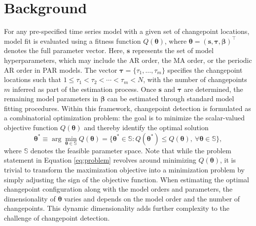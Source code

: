 \section{Background}\label{background}

For any pre-specified time series model with a given set of changepoint locations, model fit is evaluated using a fitness function \(Q(\boldsymbol{\theta})\), where \(\boldsymbol{\theta}=(\boldsymbol{s},\boldsymbol{\tau},\boldsymbol{\beta})^\top\) denotes the full parameter vector. Here, \(\boldsymbol{s}\) represents the set of model hyperparameters, which may include the AR order, the MA order, or the periodic AR order in PAR models. The vector \(\boldsymbol{\tau}=\{\tau_{1}, \ldots, \tau_{m}\}\) specifies the changepoint locations such that \(1\leq\tau_{1}<\tau_{2}<\cdots<\tau_{m}< N\), with the number of changepoints \(m\) inferred as part of the estimation process. Once \(\boldsymbol{s}\) and \(\boldsymbol{\tau}\) are determined, the remaining model parameters in \(\boldsymbol{\beta}\) can be estimated through standard model fitting procedures. Within this framework, changepoint detection is formulated as a combinatorial optimization problem: the goal is to minimize the scalar-valued objective function \(Q(\boldsymbol{\theta})\) and thereby identify the optimal solution
\begin{equation}
    \boldsymbol{\theta}^{*}\equiv 
    \arg \min_{\boldsymbol{\theta}\in\mathbb{S}}Q(\boldsymbol{\theta}) = \{\boldsymbol{\theta}^{*}\in\mathbb{S}:Q(\boldsymbol{\theta}^{*}) \leq Q(\boldsymbol{\theta}), \ \forall\boldsymbol{\theta}\in\mathbb{S}\}, 
    \label{eq:problem}
\end{equation}
where \(\mathbb{S}\) denotes the feasible parameter space. Note that while the problem statement in Equation \eqref{eq:problem} revolves around minimizing \(Q(\boldsymbol{\theta})\), it is trivial to transform the maximization objective into a minimization problem by simply adjusting the sign of the objective function. When estimating the optimal changepoint configuration along with the model orders and parameters, the dimensionality of \(\boldsymbol{\theta}\) varies and depends on the model order and the number of changepoints. This dynamic dimensionality adds further complexity to the challenge of changepoint detection.

